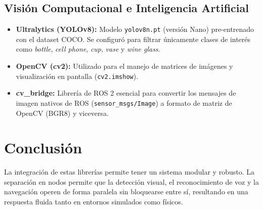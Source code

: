 \documentclass[12pt,a4paper]{article}
\begin{document}
\subsection{Visión Computacional e Inteligencia Artificial}
\begin{itemize}
    \item \textbf{Ultralytics (YOLOv8):} Modelo \texttt{yolov8n.pt} (versión Nano) pre-entrenado con el dataset COCO. Se configuró para filtrar únicamente clases de interés como \textit{bottle}, \textit{cell phone}, \textit{cup}, \textit{vase} y \textit{wine glass}.
    \item \textbf{OpenCV (cv2):} Utilizado para el manejo de matrices de imágenes y visualización en pantalla (\texttt{cv2.imshow}).
    \item \textbf{cv\_bridge:} Librería de ROS 2 esencial para convertir los mensajes de imagen nativos de ROS (\texttt{sensor\_msgs/Image}) a formato de matriz de OpenCV (BGR8) y viceversa.
\end{itemize}

\section{Conclusión}
La integración de estas librerías permite tener un sistema modular y robusto. La separación en nodos permite que la detección visual, el reconocimiento de voz y la navegación operen de forma paralela sin bloquearse entre sí, resultando en una respuesta fluida tanto en entornos simulados como físicos.
\end{document}
